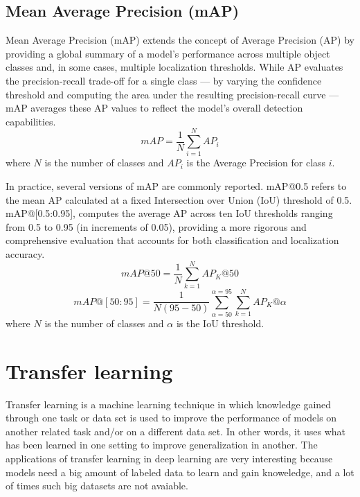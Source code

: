 \subsection*{Mean Average Precision (mAP)}
Mean Average Precision (mAP) extends the concept of Average Precision (AP) by providing a global summary of a model’s performance across multiple object classes and, in some cases, multiple localization thresholds. While AP evaluates the precision-recall trade-off for a single class — by varying the confidence threshold and computing the area under the resulting precision-recall curve — mAP averages these AP values to reflect the model’s overall detection capabilities.
\begin{equation}
    mAP = \frac{1}{N} \sum_{i=1}^{N} AP_i
\end{equation}
where \( N \) is the number of classes and \( AP_i \) is the Average Precision for class \( i \).

In practice, several versions of mAP are commonly reported. mAP@0.5 refers to the mean AP calculated at a fixed Intersection over Union (IoU) threshold of 0.5. mAP@[0.5:0.95], computes the average AP across ten IoU thresholds ranging from 0.5 to 0.95 (in increments of 0.05), providing a more rigorous and comprehensive evaluation that accounts for both classification and localization accuracy.
\begin{equation}
    mAP@50 = \frac{1}{N} \sum_{k=1}^{N} AP_K@50
\end{equation}
\begin{equation}
    mAP@[50:95] = \frac{1}{N(95-50)}\sum_{\alpha = 50}^{\alpha = 95}\sum_{k=1}^{N} AP_K@\alpha
\end{equation}
where \( N \)  is the number of classes and \(\alpha\) is the IoU threshold.
\section{Transfer learning}
Transfer learning is a machine learning technique in which knowledge gained through one task or data set is used to improve the performance of models on another related task and/or on a different data set. 
In other words, it uses what has been learned in one setting to improve generalization in another. The applications of transfer learning in deep learning are very interesting because models need a big amount of labeled data to learn and gain knoweledge, and a lot of times such big datasets are not avaiable.

